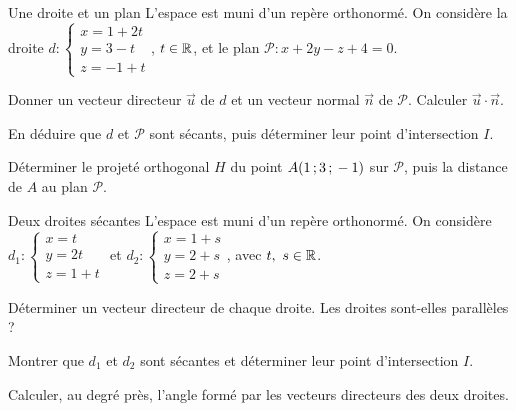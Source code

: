 
\begin{exercice}[2]{Une droite et un plan}
L'espace est muni d'un repère orthonormé. On considère la droite $d:\begin{cases}x=1+2t\\y=3-t\\z=-1+t\end{cases}$, $t\in\mathbb{R}$, et le plan
$\mathcal{P}:x+2y-z+4=0$.
\begin{questions}
  \item Donner un vecteur directeur $\vec u$ de $d$ et un vecteur normal $\vec n$ de $\mathcal{P}$. Calculer $\vec u\cdot\vec n$.
  \item En déduire que $d$ et $\mathcal{P}$ sont sécants, puis déterminer leur point d'intersection $I$.
  \item Déterminer le projeté orthogonal $H$ du point $A(1\,{;}\,3\,{;}\,-1)$ sur $\mathcal{P}$, puis la distance de $A$ au plan $\mathcal{P}$.
\end{questions}
\end{exercice}

\begin{exercice}[2]{Deux droites sécantes}
L'espace est muni d'un repère orthonormé. On considère $d_1:\begin{cases}x=t\\y=2t\\z=1+t\end{cases}$ et
$d_2:\begin{cases}x=1+s\\y=2+s\\z=2+s\end{cases}$, avec $t,\ s\in\mathbb{R}$.
\begin{questions}
  \item Déterminer un vecteur directeur de chaque droite. Les droites sont-elles parallèles ?
  \item Montrer que $d_1$ et $d_2$ sont sécantes et déterminer leur point d'intersection $I$.
  \item Calculer, au degré près, l'angle formé par les vecteurs directeurs des deux droites.
\end{questions}
\end{exercice}

